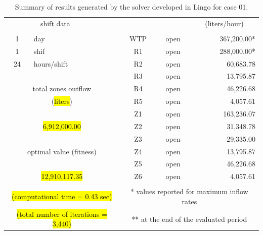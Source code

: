 \documentclass{singlecol}
\theoremstyle{TH}{
\newtheorem{lemma}{Lemma}
\newtheorem{theorem}[lemma]{Theorem}
\newtheorem{corrolary}[lemma]{Corrolary}
\newtheorem{conjecture}[lemma]{Conjecture}
\newtheorem{proposition}[lemma]{Proposition}
\newtheorem{claim}[lemma]{Claim}
\newtheorem{stheorem}[lemma]{Wrong Theorem}
\newtheorem{algorithm}{Algorithm}
}
\theoremstyle{THrm}{
\newtheorem{definition}{Definition}[section]
\newtheorem{question}{Question}[section]
\newtheorem{remark}{Remark}
\newtheorem{scheme}{Scheme}
}
\theoremstyle{THhit}{
\newtheorem{case}{Case}[section]
}
\begin{document}
\begin{table}[t]
\begin{center}
\begin{small}
\begin{tabular}{ c r r r r r }
		\multicolumn{2}{c}{shift data}     &   &      & \multicolumn{1}{c}{} & \multicolumn{1}{c}{(liters/hour)} \\
		   \\
		1   &  \multicolumn{1}{l}{day}   &              		& \multicolumn{1}{c}{WTP}    & \multicolumn{1}{c}{open} &  367,200.00* \\
		1   &  \multicolumn{1}{l}{shif}  &         			    & \multicolumn{1}{c}{R1}     & \multicolumn{1}{c}{open} &  288,000.00* \\
		24  &  \multicolumn{1}{l}{hours/shift}        &         & \multicolumn{1}{c}{R2}     & \multicolumn{1}{c}{open} &    60,683.78 \\
	   &      &              									& \multicolumn{1}{c}{R3}     & \multicolumn{1}{c}{open} &    13,795.87 \\
	   \multicolumn{3}{c}{total zones outflow}                  & \multicolumn{1}{c}{R4}     & \multicolumn{1}{c}{open} &    46,226.68 \\
	   \multicolumn{3}{c}{(\hl{liters})}              			& \multicolumn{1}{c}{R5}     & \multicolumn{1}{c}{open} &     4,057.61 \\
	   &      &              									& \multicolumn{1}{c}{Z1}     & \multicolumn{1}{c}{open} &   163,236.07 \\
	   \multicolumn{3}{c}{\hl{6,912,000.00}}              			& \multicolumn{1}{c}{Z2}     & \multicolumn{1}{c}{open} &    31,348.78 \\
	      &              &              						& \multicolumn{1}{c}{Z3}     & \multicolumn{1}{c}{open} &    29,335.00 \\
	   \multicolumn{3}{c}{optimal value (fitness)}              & \multicolumn{1}{c}{Z4}     & \multicolumn{1}{c}{open} &    13,795.87 \\
	   &             &             						 		& \multicolumn{1}{c}{Z5}     & \multicolumn{1}{c}{open} &    46,226.68 \\
	   \multicolumn{3}{c}{\hl{12,910,117.35}}              			& \multicolumn{1}{c}{Z6}     & \multicolumn{1}{c}{open} &     4,057.61 \\
	   \\
	   \multicolumn{3}{c}{\hl{(computational time  = 0.43 sec)}}     & \multicolumn{3}{c}{* values reported for maximum inflow rates} \\
	   \multicolumn{3}{c}{\hl{(total number of iterations = 3,440)}}   & \multicolumn{3}{c}{** at the end of the evaluated period} 
	\end{tabular}
		\end{small}
\caption{Summary of results generated by the solver developed in Lingo for case 01.}
\label{tab:lingoEvalCase01}
\end{center}
\end{table}
\end{document}
